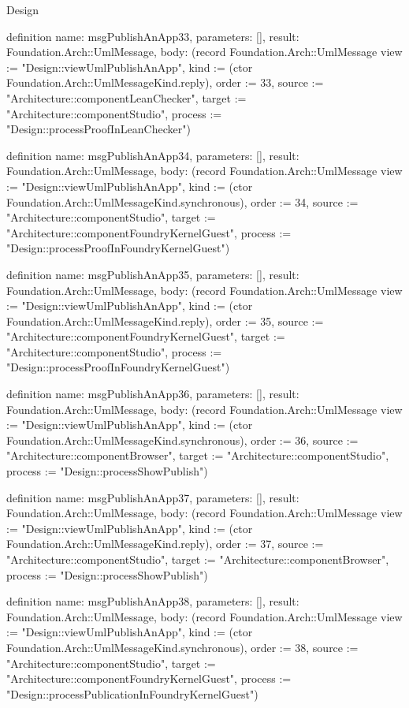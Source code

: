 \begin{lexlean}{Design}
\begin{semanticmodule}
definition{
  name: msgPublishAnApp33,
  parameters: [],
  result: Foundation.Arch::UmlMessage,
  body: (record Foundation.Arch::UmlMessage {view := "Design::viewUmlPublishAnApp", kind := (ctor Foundation.Arch::UmlMessageKind.reply), order := 33, source := "Architecture::componentLeanChecker", target := "Architecture::componentStudio", process := "Design::processProofInLeanChecker"})
}

definition{
  name: msgPublishAnApp34,
  parameters: [],
  result: Foundation.Arch::UmlMessage,
  body: (record Foundation.Arch::UmlMessage {view := "Design::viewUmlPublishAnApp", kind := (ctor Foundation.Arch::UmlMessageKind.synchronous), order := 34, source := "Architecture::componentStudio", target := "Architecture::componentFoundryKernelGuest", process := "Design::processProofInFoundryKernelGuest"})
}

definition{
  name: msgPublishAnApp35,
  parameters: [],
  result: Foundation.Arch::UmlMessage,
  body: (record Foundation.Arch::UmlMessage {view := "Design::viewUmlPublishAnApp", kind := (ctor Foundation.Arch::UmlMessageKind.reply), order := 35, source := "Architecture::componentFoundryKernelGuest", target := "Architecture::componentStudio", process := "Design::processProofInFoundryKernelGuest"})
}

definition{
  name: msgPublishAnApp36,
  parameters: [],
  result: Foundation.Arch::UmlMessage,
  body: (record Foundation.Arch::UmlMessage {view := "Design::viewUmlPublishAnApp", kind := (ctor Foundation.Arch::UmlMessageKind.synchronous), order := 36, source := "Architecture::componentBrowser", target := "Architecture::componentStudio", process := "Design::processShowPublish"})
}

definition{
  name: msgPublishAnApp37,
  parameters: [],
  result: Foundation.Arch::UmlMessage,
  body: (record Foundation.Arch::UmlMessage {view := "Design::viewUmlPublishAnApp", kind := (ctor Foundation.Arch::UmlMessageKind.reply), order := 37, source := "Architecture::componentStudio", target := "Architecture::componentBrowser", process := "Design::processShowPublish"})
}

definition{
  name: msgPublishAnApp38,
  parameters: [],
  result: Foundation.Arch::UmlMessage,
  body: (record Foundation.Arch::UmlMessage {view := "Design::viewUmlPublishAnApp", kind := (ctor Foundation.Arch::UmlMessageKind.synchronous), order := 38, source := "Architecture::componentStudio", target := "Architecture::componentFoundryKernelGuest", process := "Design::processPublicationInFoundryKernelGuest"})
}


\end{semanticmodule}
\end{lexlean}
